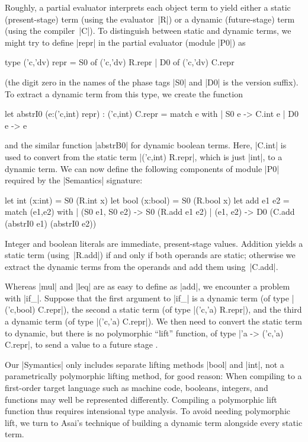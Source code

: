 Roughly, a partial evaluator interprets each object term to yield either
a static (present-stage) term (using the evaluator~|R|) or
a dynamic (future-stage) term (using the compiler~|C|).  To
distinguish between static and dynamic terms, we might try to define
|repr| in the partial evaluator (module |P0|) as
\begin{code}
type ('c,'dv) repr = S0 of ('c,'dv) R.repr | D0 of ('c,'dv) C.repr
\end{code}
(the digit zero in the names of the phase tags |S0| and |D0| is the
version suffix).
To extract a dynamic term from this type, we create the function
\begin{code}
let abstrI0 (e:('c,int) repr) : ('c,int) C.repr =
  match e with
  | S0 e -> C.int e
  | D0 e -> e
\end{code}
and the similar function |abstrB0| for dynamic boolean terms. Here, 
|C.int| is used to convert from the static term |('c,int) R.repr|, 
which is just |int|, to a dynamic term. We can now define the following
components of module |P0| required by the |Semantics| signature:
\begin{code}
let int  (x:int)  = S0 (R.int x)
let bool (x:bool) = S0 (R.bool x)
let add e1 e2 = 
  match (e1,e2) with
  | (S0 e1, S0 e2) -> S0 (R.add e1 e2)
  | (e1, e2)       -> D0 (C.add (abstrI0 e1) (abstrI0 e2))
\end{code}
Integer and boolean literals are immediate, present-stage
values. Addition yields a static term (using~|R.add|) if and only 
if both operands are static; otherwise we extract the dynamic terms 
from the operands and add them using~|C.add|.

Whereas |mul| and |leq| are as easy to define as |add|, we encounter
a problem with |if_|.  Suppose that the first argument to |if_| 
is a dynamic term
(of type |('c,bool) C.repr|), the second a static term 
(of type |('c,'a) R.repr|), and the third a
dynamic term (of type |('c,'a) C.repr|). We then need to convert
the static term to dynamic, but there is no polymorphic ``lift''
function, of type |'a -> ('c,'a) C.repr|, to send a value to a future stage
\citep{xi-guarded,WalidPOPL03}.
\begin{comment}
(By the way, if we
were to add polymorphic \texttt{lift} to the type class
\texttt{Symantics repr}, then \texttt{repr} would become an instance of
\texttt{Applicative} and thus \texttt{Functor}:\texttt{ fmap
f = app (lift f)~}.)
\end{comment}

Our |Symantics| only includes separate lifting methods |bool| and
|int|, not a parametrically polymorphic lifting method, for good reason:
When compiling to a first-order target language such as machine code,
booleans, integers, and functions may well be represented differently.
Compiling a polymorphic lift function thus requires intensional type
analysis.  To avoid needing polymorphic lift, we turn to
Asai's technique \citep{asai-binding-time,sumii-hybrid} of
building a dynamic term alongside every static term.

